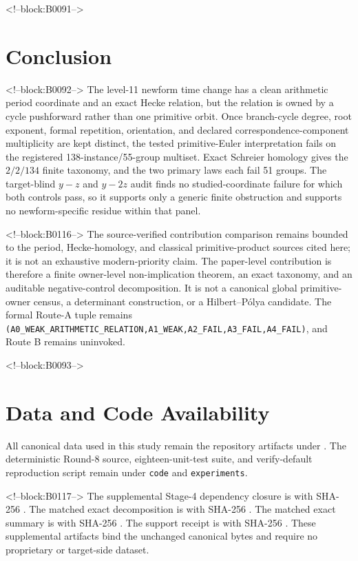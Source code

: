 \documentclass[11pt]{article}
\theoremstyle{definition}
\theoremstyle{remark}
\begin{document}
<!--block:B0091-->
\section{Conclusion}

<!--block:B0092-->
The level-11 newform time change has a clean arithmetic period coordinate and an exact Hecke relation, but the relation is owned by a cycle pushforward rather than one primitive orbit. Once branch-cycle degree, root exponent, formal repetition, orientation, and declared correspondence-component multiplicity are kept distinct, the tested primitive-Euler interpretation fails on the registered 138-instance/55-group multiset. Exact Schreier homology gives the $2/2/134$ finite taxonomy, and the two primary laws each fail 51 groups. The target-blind $y-z$ and $y-2z$ audit finds no studied-coordinate failure for which both controls pass, so it supports only a generic finite obstruction and supports no newform-specific residue within that panel.

<!--block:B0116-->
The source-verified contribution comparison remains bounded to the period, Hecke-homology, and classical primitive-product sources cited here; it is not an exhaustive modern-priority claim. The paper-level contribution is therefore a finite owner-level non-implication theorem, an exact taxonomy, and an auditable negative-control decomposition. It is not a canonical global primitive-owner census, a determinant construction, or a Hilbert--Pólya candidate. The formal Route-A tuple remains \texttt{(A0\_WEAK\_ARITHMETIC\_RELATION,A1\_WEAK,A2\_FAIL,A3\_FAIL,A4\_FAIL)}, and Route B remains uninvoked.

<!--block:B0093-->
\section*{Data and Code Availability}
All canonical data used in this study remain the repository artifacts under
.
The deterministic Round-8 source, eighteen-unit-test suite, and verify-default reproduction script remain under \texttt{code} and \texttt{experiments}.

<!--block:B0117-->
The supplemental Stage-4 dependency closure is
with SHA-256
.
The matched exact decomposition is
with SHA-256
.
The matched exact summary is
with SHA-256
.
The support receipt is
with SHA-256
.
These supplemental artifacts bind the unchanged canonical bytes and require no proprietary or target-side dataset.
\end{document}

